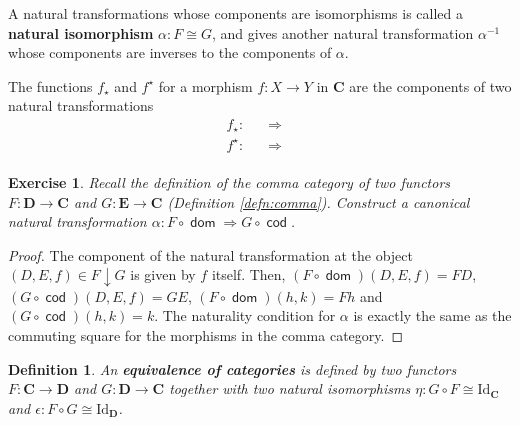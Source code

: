 \documentclass[a5paper,oneside,11pt]{article}
\newtheorem{ex}{Exercise}
\newtheorem{defn}{Definition}
\newcommand\Id{\mathord{\mathrm{Id}}}
\newcommand\1{\mathord{\mathrm{1}}}
\newcommand\cat[1]{\mathbf{#1}}
\newcommand\Hom[3]{\mathop{\mathsf{Hom}_{\cat{#1}}(#2, #3)}}
\newcommand\dom{\mathop{\mathsf{dom}}}
\newcommand\cod{\mathop{\mathsf{cod}}}
\begin{document}
A natural transformations whose components are isomorphisms is called a
\textbf{natural isomorphism} $\alpha : F \cong G$, and gives another natural
transformation $\alpha^{-1}$ whose components are inverses to the components of $\alpha$.

The functions $f_\star$ and $f^\star$ for a
morphism $f : X \rightarrow Y$ in $\cat{C}$ are the components of two natural transformations
\begin{equation*}
    \begin{split}
        f_\star : \Hom{C}{-}{X} & \Longrightarrow \Hom{C}{-}{Y} \\
        f^\star : \Hom{C}{Y}{-} & \Longrightarrow \Hom{C}{X}{-} \\
    \end{split}
\end{equation*}

\begin{ex}
    Recall the definition of the comma category of two functors
    $F : \cat{D} \longrightarrow \cat{C}$ and $G : \cat{E} \longrightarrow \cat{C}$
    (Definition \ref{defn:comma}). Construct a canonical natural transformation
    $\alpha : F \circ \dom \Longrightarrow G \circ \cod$.
\end{ex}
\begin{proof}
    The component of the natural transformation at the object
    $(D, E, f) \in F \downarrow G$ is given by $f$ itself.
    Then, $(F \circ \dom)(D, E, f) = FD$, $(G \circ \cod)(D, E, f) = GE$,
    $(F \circ \dom)(h, k) = Fh$ and $(G \circ \cod)(h, k) = k$.
    The naturality condition for $\alpha$ is exactly the same as the commuting square
    for the morphisms in the comma category.
\end{proof}

\begin{defn}
    \label{defn:cateq}
    An \textbf{equivalence of categories} is defined by two functors
    $F : \cat{C} \longrightarrow \cat{D}$ and $G : \cat{D} \longrightarrow \cat{C}$
    together with two natural isomorphisms $\eta : G \circ F \cong \Id_\cat{C}$ and
    $\epsilon : F \circ G \cong \Id_\cat{D}$.
\end{defn}
\end{document}
